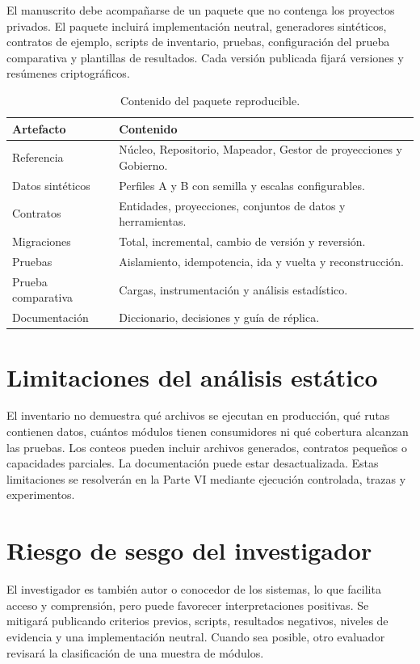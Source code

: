 El manuscrito debe acompañarse de un paquete que no contenga los proyectos privados. El
paquete incluirá implementación neutral, generadores sintéticos, contratos de ejemplo,
scripts de inventario, pruebas, configuración del prueba comparativa y plantillas de resultados.
Cada versión publicada fijará versiones y resúmenes criptográficos.

\begin{table}[H]
\centering
\caption{Contenido del paquete reproducible.}
\label{tab:paquete-reproducible}
\begin{tabularx}{\textwidth}{p{3.6cm}X}
\toprule
Artefacto & Contenido \\
\midrule
Referencia & Núcleo, Repositorio, Mapeador, Gestor de proyecciones y Gobierno.\\
Datos sintéticos & Perfiles A y B con semilla y escalas configurables.\\
Contratos & Entidades, proyecciones, conjuntos de datos y herramientas.\\
Migraciones & Total, incremental, cambio de versión y reversión.\\
Pruebas & Aislamiento, idempotencia, ida y vuelta y reconstrucción.\\
Prueba comparativa & Cargas, instrumentación y análisis estadístico.\\
Documentación & Diccionario, decisiones y guía de réplica.\\
\bottomrule
\end{tabularx}
\end{table}

\section{Limitaciones del análisis estático}

El inventario no demuestra qué archivos se ejecutan en producción, qué rutas contienen
datos, cuántos módulos tienen consumidores ni qué cobertura alcanzan las pruebas. Los
conteos pueden incluir archivos generados, contratos pequeños o capacidades parciales.
La documentación puede estar desactualizada. Estas limitaciones se resolverán en la
Parte VI mediante ejecución controlada, trazas y experimentos.

\section{Riesgo de sesgo del investigador}

El investigador es también autor o conocedor de los sistemas, lo que facilita acceso y
comprensión, pero puede favorecer interpretaciones positivas. Se mitigará publicando
criterios previos, scripts, resultados negativos, niveles de evidencia y una
implementación neutral. Cuando sea posible, otro evaluador revisará la clasificación de
una muestra de módulos.


